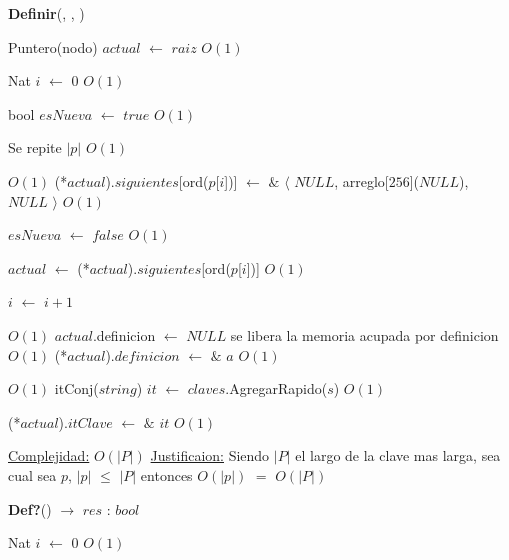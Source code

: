 \begin{Algoritmos}
\begin{algorithm}[H]
\begin{algorithmic}[1]
\end{algorithmic}
\end{algorithm}
  

\begin{algorithm}[H]
{\textbf{Definir}(, , )}
\begin{algorithmic}[1]

\State Puntero(nodo) $actual$ $\gets$ $raiz$ \Comment $O(1)$

\State Nat $i$ $\gets$ $0$ \Comment $O(1)$

\State bool $esNueva$ $\gets$ $true$ \Comment $O(1)$

   \Comment Se repite $|p|$ $O(1)$
	
	
	 \Comment $O(1)$
		\State (*$actual$).$siguientes$[ord($p$[$i$])] $\gets$	 $\&$ $\langle$ $NULL$, arreglo[$256$]($NULL$), $NULL$ $\rangle$  \Comment $O(1)$
		
		\State $esNueva$ $\gets$ $false$ \Comment $O(1)$	 
	
	\EndIf
	
	\State $actual$ $\gets$ (*$actual$).$siguientes$[ord($p$[$i$])] \Comment $O(1)$

	\State $i$ $\gets$ $i + 1$
\EndWhile 

 \Comment $O(1)$
	\State $actual$.definicion $\gets$ $NULL$ \Comment se libera la memoria acupada por definicion $O(1)$
\EndIf
\State (*$actual$).$definicion$ $\gets$ $\&$ $a$ \Comment $O(1)$

 \Comment $O(1)$
	\State itConj($string$) $it$ $\gets$  $claves$.AgregarRapido($s$) \Comment $O(1)$
	
	\State (*$actual$).$itClave$ $\gets$ $\&$ $it$ \Comment $O(1)$
\EndIf

\medskip
\State \underline{Complejidad:} $O(|P|)$
\State \underline{Justificaion:} Siendo $|P|$ el largo de la clave mas larga, sea cual sea $p$, $|p|$ $\leq$ $|P|$ entonces 	$O(|p|)$ $=$ $O(|P|)$


\end{algorithmic}
\end{algorithm}  
  
  
\begin{algorithm}[H]
{\textbf{Def?}() $\to$ $res$ : $bool$}
\begin{algorithmic}[1]

\State Nat $i$ $\gets$ $0$ \Comment $O(1)$


\end{algorithmic}
\end{algorithm}
\end{Algoritmos}
